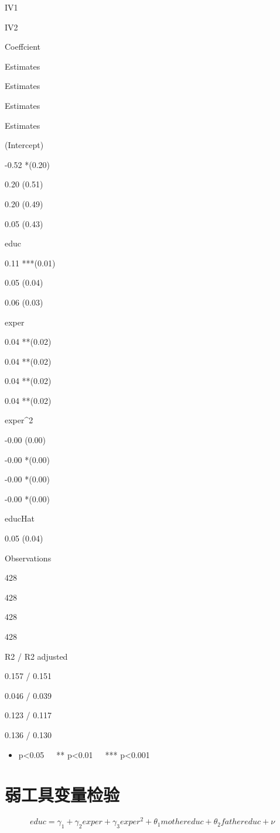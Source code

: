 \documentclass[
]{article}
\providecommand{\tightlist}{%
  \setlength{\itemsep}{0pt}\setlength{\parskip}{0pt}}
\begin{document}
IV1

IV2

Coeffcient

Estimates

Estimates

Estimates

Estimates

(Intercept)

-0.52 *(0.20)

0.20 (0.51)

0.20 (0.49)

0.05 (0.43)

educ

0.11 ***(0.01)

0.05 (0.04)

0.06 (0.03)

exper

0.04 **(0.02)

0.04 **(0.02)

0.04 **(0.02)

0.04 **(0.02)

exper\^{}2

-0.00 (0.00)

-0.00 *(0.00)

-0.00 *(0.00)

-0.00 *(0.00)

educHat

0.05 (0.04)

Observations

428

428

428

428

R2 / R2 adjusted

0.157 / 0.151

0.046 / 0.039

0.123 / 0.117

0.136 / 0.130

\begin{itemize}
\tightlist
\item
  p\textless0.05~~~** p\textless0.01~~~*** p\textless0.001
\end{itemize}

\hypertarget{ux5f31ux5de5ux5177ux53d8ux91cfux68c0ux9a8c}{%
\section{弱工具变量检验}\label{ux5f31ux5de5ux5177ux53d8ux91cfux68c0ux9a8c}}

\[\begin{equation}
educ=\gamma_{1}+\gamma_{2}exper+\gamma_{3} exper^2+\theta_{1} mothereduc+ \theta_{2}fathereduc+\nu
\label{eq:educlm10}
\end{equation}\]
\end{document}
